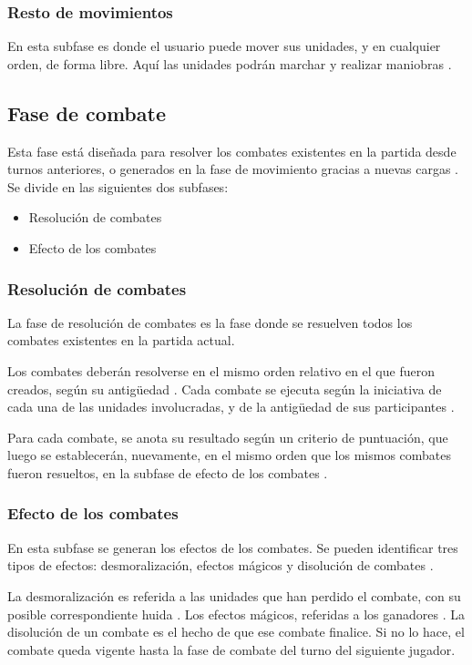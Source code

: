 \subsubsection*{Resto de movimientos}
En esta subfase es donde el usuario puede mover sus unidades, y en
cualquier orden, de forma libre. Aquí las unidades podrán marchar
 y realizar maniobras .

\subsection*{Fase de combate}
\label{fasecombate}
Esta fase está diseñada para resolver los combates existentes en la
partida desde turnos anteriores, o generados en la fase de movimiento
gracias a nuevas cargas . Se divide en las siguientes dos subfases:

\begin{itemize}
\item Resolución de combates
\item Efecto de los combates
\end{itemize}

\subsubsection*{Resolución de combates}
La fase de resolución de combates es la fase donde se resuelven todos
los combates existentes en la partida actual.

Los combates deberán resolverse en el mismo orden relativo en el que
fueron creados, según su antigüedad . Cada
combate se ejecuta según la iniciativa de cada una de las unidades involucradas, y de la
antigüedad de sus participantes .

Para cada combate, se anota su resultado según un criterio de
puntuación, que luego se establecerán, nuevamente, en el mismo orden
que los mismos combates fueron resueltos, en la subfase de efecto de
los combates .

\subsubsection*{Efecto de los combates}
En esta subfase se generan los efectos de los combates. Se pueden
identificar tres tipos de efectos: desmoralización, efectos mágicos y
disolución de combates .

La desmoralización es referida a las unidades que han perdido el
combate, con su posible correspondiente huida . Los efectos mágicos,
referidas a los ganadores . La disolución de un combate es el hecho de
que ese combate finalice. Si no lo hace, el combate queda vigente
hasta la fase de combate del turno del siguiente jugador.

